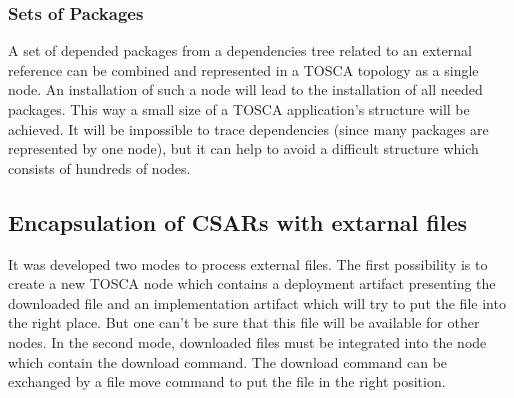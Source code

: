 \subsubsection*{Sets of Packages} \label{mode:setsofpkg}
A set of depended packages from a dependencies tree related to an external reference can be combined and represented in a TOSCA topology as a single node.
An installation of such a node will lead to the installation of all needed packages.
This way a small size of a TOSCA application's structure will be achieved.
It will be impossible to trace dependencies (since many packages are represented by one node), but it can help to avoid a difficult structure which consists of hundreds of nodes. 

\subsection{Encapsulation of CSARs with extarnal files}
It was developed two modes to process external files.
The first possibility is to create a new TOSCA node which contains a deployment artifact presenting the downloaded file and an implementation artifact which will try to put the file into the right place.
But one can't be sure that this file will be available for other nodes.
In the second mode, downloaded files must be integrated into the node which contain the download command.
The download command can be exchanged by a file move command to put the file in the right position.

